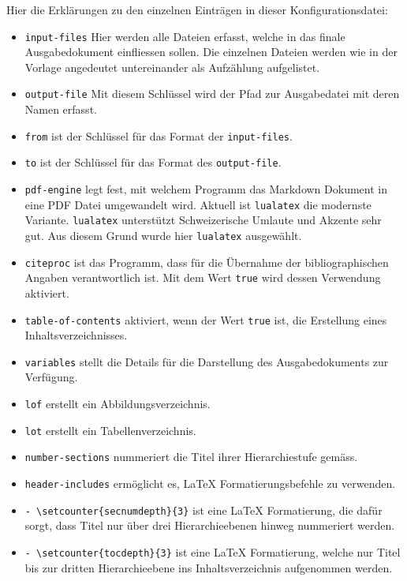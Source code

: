 \documentclass[
  nswissgerman,
  a4paper,
  DIV=11,
  numbers=noendperiod,
  ngerman]{scrreprt}
\providecommand{\tightlist}{%
  \setlength{\itemsep}{0pt}\setlength{\parskip}{0pt}}
\begin{document}
Hier die Erklärungen zu den einzelnen Einträgen in dieser
Konfigurationsdatei:

\begin{itemize}
\tightlist
\item
  \texttt{input-files} Hier werden alle Dateien erfasst, welche in das
  finale Ausgabedokument einfliessen sollen. Die einzelnen Dateien
  werden wie in der Vorlage angedeutet untereinander als Aufzählung
  aufgelistet.
\item
  \texttt{output-file} Mit diesem Schlüssel wird der Pfad zur
  Ausgabedatei mit deren Namen erfasst.
\item
  \texttt{from} ist der Schlüssel für das Format der
  \texttt{input-files}.
\item
  \texttt{to} ist der Schlüssel für das Format des \texttt{output-file}.
\item
  \texttt{pdf-engine} legt fest, mit welchem Programm das Markdown
  Dokument in eine PDF Datei umgewandelt wird. Aktuell ist
  \texttt{lualatex} die modernste Variante. \texttt{lualatex}
  unterstützt Schweizerische Umlaute und Akzente sehr gut. Aus diesem
  Grund wurde hier \texttt{lualatex} ausgewählt.
\item
  \texttt{citeproc} ist das Programm, dass für die Übernahme der
  bibliographischen Angaben verantwortlich ist. Mit dem Wert
  \texttt{true} wird dessen Verwendung aktiviert.
\item
  \texttt{table-of-contents} aktiviert, wenn der Wert \texttt{true} ist,
  die Erstellung eines Inhaltsverzeichnisses.
\item
  \texttt{variables} stellt die Details für die Darstellung des
  Ausgabedokuments zur Verfügung.
\item
  \texttt{lof} erstellt ein Abbildungsverzeichnis.
\item
  \texttt{lot} erstellt ein Tabellenverzeichnis.
\item
  \texttt{number-sections} nummeriert die Titel ihrer Hierarchiestufe
  gemäss.
\item
  \texttt{header-includes} ermöglicht es, LaTeX Formatierungsbefehle zu
  verwenden.
\item
  \texttt{-\ \textbackslash{}setcounter\{secnumdepth\}\{3\}} ist eine
  LaTeX Formatierung, die dafür sorgt, dass Titel nur über drei
  Hierarchieebenen hinweg nummeriert werden.
\item
  \texttt{-\ \textbackslash{}setcounter\{tocdepth\}\{3\}} ist eine LaTeX
  Formatierung, welche nur Titel bis zur dritten Hierarchieebene ins
  Inhaltsverzeichnis aufgenommen werden.

\end{itemize}
\end{document}
